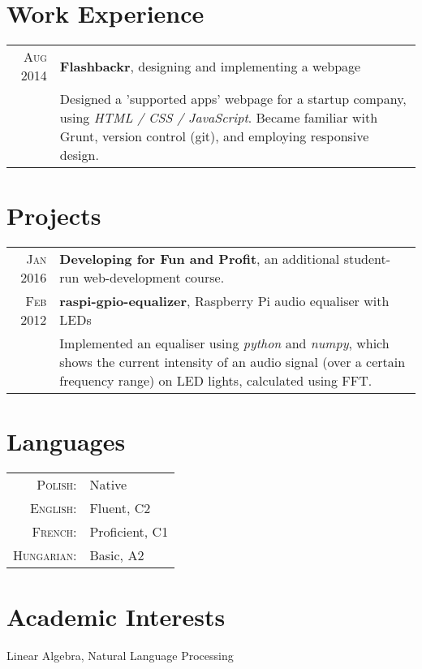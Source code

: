 \documentclass[a4paper,10pt]{article}
\begin{document}
\section{Work Experience}
\begin{tabular}{r|p{11cm}}
    \textsc{Aug} 2014 & \textbf{Flashbackr}, designing and implementing a webpage\\
                      & \footnotesize{Designed a 'supported apps' webpage for a startup company, using \emph{HTML / CSS / JavaScript}.
                        Became familiar with Grunt, version control (git), and employing responsive design.}
\end{tabular}

\section{Projects}
\begin{tabular}{r|p{11cm}}
    \textsc{Jan} 2016 & \textbf{Developing for Fun and Profit}, an additional student-run web-development course.\\
    \textsc{Feb} 2012 & \textbf{raspi-gpio-equalizer}, Raspberry Pi audio equaliser with LEDs\\
                      & \footnotesize{Implemented an equaliser using \emph{python} and \emph{numpy}, which shows the
                        current intensity of an audio signal (over a certain frequency range) on LED lights, calculated using FFT.}
\end{tabular}


\section{Languages}
\begin{tabular}{rl}
    \textsc{Polish:}    & Native\\
    \textsc{English:}   & Fluent, \textsc{C2}\\
    \textsc{French:}    & Proficient, \textsc{C1}\\
    \textsc{Hungarian:} & Basic, \textsc{A2}
\end{tabular}

\section{Academic Interests}
Linear Algebra, Natural Language Processing


\end{document}
